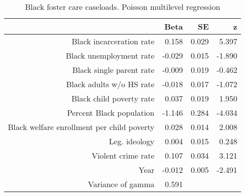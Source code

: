 \begin{table}[ht]
\centering
\begin{tabular}{rrrr}
  \hline
 & Beta & SE & z \\ 
  \hline
Black incarceration rate & 0.158 & 0.029 & 5.397 \\ 
  Black unemployment rate & -0.029 & 0.015 & -1.890 \\ 
  Black single parent rate & -0.009 & 0.019 & -0.462 \\ 
  Black adults w/o HS rate & -0.018 & 0.017 & -1.072 \\ 
  Black child poverty rate & 0.037 & 0.019 & 1.950 \\ 
  Percent Black population & -1.146 & 0.284 & -4.034 \\ 
  Black welfare enrollment per child poverty & 0.028 & 0.014 & 2.008 \\ 
  Leg. ideology & 0.004 & 0.015 & 0.248 \\ 
  Violent crime rate & 0.107 & 0.034 & 3.121 \\ 
  Year & -0.012 & 0.005 & -2.491 \\ 
  Variance of gamma & 0.591 &  &  \\ 
   \hline
\end{tabular}
\caption{Black foster care caseloads. Poisson multilevel regression} 
\label{b.c.tab}
\end{table}
